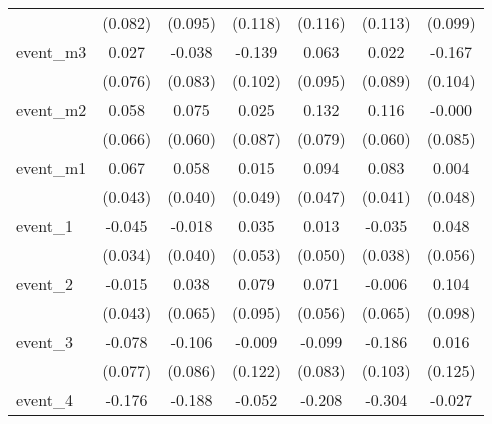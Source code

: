 {\begin{tabular}{l*{6}{c}}
            &     (0.082)         &     (0.095)         &     (0.118)         &     (0.116)         &     (0.113)         &     (0.099)         \\
[1em]
event\_m3    &       0.027         &      -0.038         &      -0.139         &       0.063         &       0.022         &      -0.167         \\
            &     (0.076)         &     (0.083)         &     (0.102)         &     (0.095)         &     (0.089)         &     (0.104)         \\
[1em]
event\_m2    &       0.058         &       0.075         &       0.025         &       0.132         &       0.116         &      -0.000         \\
            &     (0.066)         &     (0.060)         &     (0.087)         &     (0.079)         &     (0.060)         &     (0.085)         \\
[1em]
event\_m1    &       0.067         &       0.058         &       0.015         &       0.094\sym{*}  &       0.083\sym{*}  &       0.004         \\
            &     (0.043)         &     (0.040)         &     (0.049)         &     (0.047)         &     (0.041)         &     (0.048)         \\
[1em]
event\_1     &      -0.045         &      -0.018         &       0.035         &       0.013         &      -0.035         &       0.048         \\
            &     (0.034)         &     (0.040)         &     (0.053)         &     (0.050)         &     (0.038)         &     (0.056)         \\
[1em]
event\_2     &      -0.015         &       0.038         &       0.079         &       0.071         &      -0.006         &       0.104         \\
            &     (0.043)         &     (0.065)         &     (0.095)         &     (0.056)         &     (0.065)         &     (0.098)         \\
[1em]
event\_3     &      -0.078         &      -0.106         &      -0.009         &      -0.099         &      -0.186         &       0.016         \\
            &     (0.077)         &     (0.086)         &     (0.122)         &     (0.083)         &     (0.103)         &     (0.125)         \\
[1em]
event\_4     &      -0.176         &      -0.188         &      -0.052         &      -0.208         &      -0.304\sym{*}  &      -0.027         \\

\end{tabular}}
